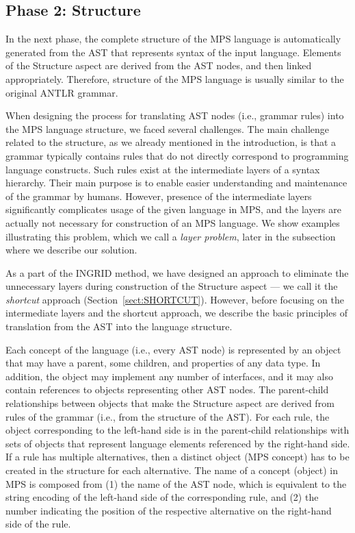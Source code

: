 \subsection{Phase 2: Structure}

In the next phase, the complete structure of the MPS language is automatically generated from the AST that represents syntax of the input language.
Elements of the Structure aspect are derived from the AST nodes, and then linked appropriately.
Therefore, structure of the MPS language is usually similar to the original ANTLR grammar.

When designing the process for translating AST nodes (i.e., grammar rules) into the MPS language structure, we faced several challenges.
The main challenge related to the structure, as we already mentioned in the introduction, is that a grammar typically contains rules that do not directly correspond to programming language constructs.
Such rules exist at the intermediate layers of a syntax hierarchy.
Their main purpose is to enable easier understanding and maintenance of the grammar by humans.
However, presence of the intermediate layers significantly complicates usage of the given language in MPS, and the layers are actually not necessary for construction of an MPS language.
We show examples illustrating this problem, which we call a \emph{layer problem}, later in the subsection where we describe our solution.

As a part of the INGRID method, we have designed an approach to eliminate the unnecessary layers during construction of the Structure aspect --- we call it the \emph{shortcut} approach (Section~\ref{sect:SHORTCUT}).
However, before focusing on the intermediate layers and the shortcut approach, we describe the basic principles of translation from the AST into the language structure.

Each concept of the language (i.e., every AST node) is represented by an object that may have a parent, some children, and properties of any data type.
In addition, the object may implement any number of interfaces, and it may also contain references to objects representing other AST nodes.
The parent-child relationships between objects that make the Structure aspect are derived from rules of the grammar (i.e., from the structure of the AST).
For each rule, the object corresponding to the left-hand side is in the parent-child relationships with sets of objects that represent language elements referenced by the right-hand side.
If a rule has multiple alternatives, then a distinct object (MPS concept) has to be created in the structure for each alternative.
The name of a concept (object) in MPS is composed from (1) the name of the AST node, which is equivalent to the string encoding of the left-hand side of the corresponding rule, and (2) the number indicating the position of the respective alternative on the right-hand side of the rule.

